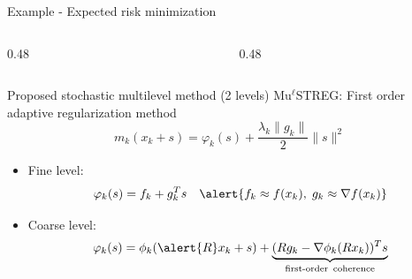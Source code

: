 \documentclass{beamer}
\newcommand{\coarse}{\phi}
\newcommand{\gk}{g_k}
\begin{document}
\begin{frame}{Example - Expected risk minimization }
\begin{itemize}
\begin{columns}
\begin{column}{0.48\textwidth}
{\begin{minipage}[t][0.58\textheight][t]{0.95\linewidth}
\end{minipage}%
}

\end{column}

\begin{column}{0.48\textwidth}


\end{column}

\end{columns}  
\end{itemize}\end{frame}







	
	
	
		\begin{frame}{Proposed stochastic multilevel method (2 levels)}
	Mu$^\ell$STREG: First order \alert{adaptive regularization method}
	$$m_k(x_k+s)=\varphi_k(s)+\frac{\lambda_k\|g_k\|}{2}\|s\|^2$$
	\begin{itemize}
	\item  Fine level: $$\varphi_k(s)=f_k+g_k^Ts \quad \alert{f_k\approx f(x_k), \; g_k\approx \nabla f(x_k)}$$ 
	\item Coarse level: 
	\begin{subequations}\label{reg_taylor_model}
$$
\varphi_k(s)=  \coarse_k(\alert{R}x_k+s)+\underbrace{(R\gk-\nabla\coarse_k(Rx_k))^Ts}_{\text{first-order \,coherence}}
$$
    \end{subequations}
    \end{itemize}
	\end{frame}
	
\end{document}
